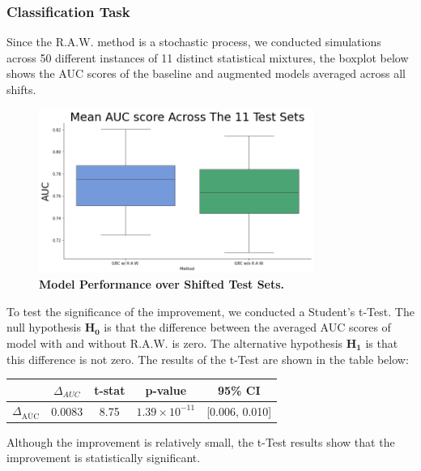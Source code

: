 \subsubsection{\textbf{Classification Task}}


Since the R.A.W. method is a stochastic process, we conducted simulations across 50 different instances of 11 distinct statistical mixtures, the boxplot below shows the AUC scores of the baseline and augmented models averaged across all shifts.

\begin{figure}[H]
    \centering
    \includegraphics[width=0.8\textwidth]{assets/MeanAUCscoreacross10.png} 
    \caption{\textbf{Model Performance over Shifted Test Sets.}}
\end{figure}

To test the significance of the improvement, we conducted a Student's t-Test. The null hypothesis $\boldsymbol{H_0}$ is that the difference between the averaged AUC scores of model with and without R.A.W. is zero. The alternative hypothesis $\boldsymbol{H_1}$ is that this difference is not zero. The results of the t-Test are shown in the table below:

\begin{table}
    \centering
    
    \begin{tabular}{lcccc}
        \toprule
        & $\Delta_{AUC}$ & t-stat & p-value & 95\% CI \\
        \midrule
        $\Delta_{\overline{\text{AUC}}}$ & 0.0083 & 8.75  & $1.39 \times 10^{-11}$ & [0.006, 0.010] \\
        \bottomrule
    \end{tabular}
\end{table}

Although the improvement is relatively small, the t-Test results show that the improvement is statistically significant.

